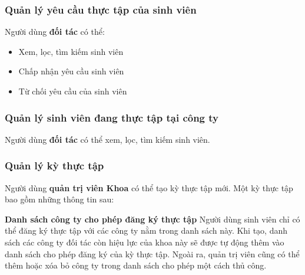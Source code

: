 \documentclass[./../main.tex]{subfiles}
\begin{document}
\hypertarget{quux1ea3n-luxfd-yuxeau-cux1ea7u-thux1ef1c-tux1eadp-cux1ee7a-sinh-viuxean}{%
	\subsubsection{Quản lý yêu cầu thực tập của sinh
		viên}\label{quux1ea3n-luxfd-yuxeau-cux1ea7u-thux1ef1c-tux1eadp-cux1ee7a-sinh-viuxean}}

Người dùng \textbf{đối tác} có thể:

\begin{itemize}
	\item

	      Xem, lọc, tìm kiếm sinh viên

	\item

	      Chấp nhận yêu cầu sinh viên

	\item

	      Từ chối yêu cầu của sinh viên

\end{itemize}

\hypertarget{quux1ea3n-luxfd-sinh-viuxean-ux111ang-thux1ef1c-tux1eadp-tux1ea1i-cuxf4ng-ty}{%
	\subsubsection{Quản lý sinh viên đang thực tập tại công
		ty}\label{quux1ea3n-luxfd-sinh-viuxean-ux111ang-thux1ef1c-tux1eadp-tux1ea1i-cuxf4ng-ty}}

Người dùng \textbf{đối tác} có thể xem, lọc, tìm kiếm sinh viên.

\hypertarget{quux1ea3n-luxfd-kux1ef3-thux1ef1c-tux1eadp}{%
	\subsubsection{Quản lý kỳ thực
		tập}\label{quux1ea3n-luxfd-kux1ef3-thux1ef1c-tux1eadp}}

Người dùng \textbf{quản trị viên Khoa} có thể tạo kỳ thực tập mới. Một
kỳ thực tập bao gồm những thông tin sau:


\textbf{Danh sách công ty cho phép đăng ký thực tập} Người dùng sinh
viên chỉ có thể đăng ký thực tập với các công ty nằm trong danh sách
này. Khi tạo, danh sách các công ty đối tác còn hiệu lực của khoa này sẽ
được tự động thêm vào danh sách cho phép đăng ký của kỳ thực tập. Ngoài
ra, quản trị viên cũng có thể thêm hoặc xóa bỏ công ty trong danh sách
cho phép một cách thủ công.
\end{document}
